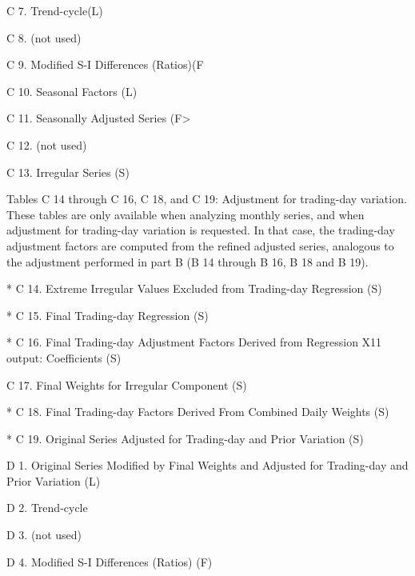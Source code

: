 C 7. Trend-cycle(L) 
 



C 8. (not used)
 



C 9. Modified S-I Differences (Ratios)(F 
 



C 10. Seasonal Factors (L) 
 



C 11. Seasonally Adjusted Series (F>  
 



C 12. (not used)
 



C 13. Irregular Series (S) 
 



Tables C 14 through C 16, C 18, and C 19: Adjustment for trading-day variation. These tables are only available when analyzing monthly series, and when adjustment for trading-day variation is requested. In that case, the trading-day adjustment factors are computed from the refined adjusted series, analogous to the adjustment performed in part B (B 14 through B 16, B 18 and B 19).
 



* C 14. Extreme Irregular Values Excluded from Trading-day Regression (S) 
 



* C 15. Final Trading-day Regression (S) 
 



* C 16. Final Trading-day Adjustment Factors Derived from Regression X11 output: Coefficients (S) 
 



C 17. Final Weights for Irregular Component (S) 
 



* C 18. Final Trading-day Factors Derived From Combined Daily Weights (S) 
 



* C 19. Original Series Adjusted for Trading-day and Prior Variation (S) 
 



D 1. Original Series Modified by Final Weights and Adjusted for Trading-day and Prior Variation (L) 
 



D 2. Trend-cycle 
 



D 3. (not used)
 



D 4. Modified S-I Differences (Ratios) (F) 
 



